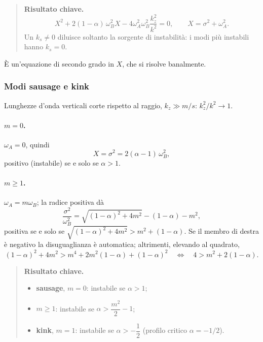 \begin{quote}
\textbf{Risultato chiave.}
\[
X^2+2(1-\alpha)\,\omega_B^2X-4\omega_A^2\omega_B^2\frac{k_z^2}{k^2}=0,\qquad X=\sigma^2+\omega_A^2 .
\]
Un $k_s\neq0$ diluisce soltanto la sorgente di instabilità: i modi più instabili hanno $k_s=0$.
\end{quote}

È un'equazione di secondo grado in $X$, che si risolve banalmente.

\subsubsection{Modi sausage e kink}

Lunghezze d'onda verticali corte rispetto al raggio, $k_z\gg m/s$: $k_z^2/k^2\to1$.

\paragraph{$m=0$.} $\omega_A=0$, quindi
\begin{equation}
X=\sigma^2=2(\alpha-1)\,\omega_B^2 ,
\end{equation}
positivo (instabile) se e solo se $\alpha>1$.

\paragraph{$m\ge1$.} $\omega_A=m\omega_B$; la radice positiva dà
\begin{equation}
\frac{\sigma^2}{\omega_B^2}=\sqrt{(1-\alpha)^2+4m^2}-(1-\alpha)-m^2 ,
\end{equation}
positiva se e solo se $\sqrt{(1-\alpha)^2+4m^2}>m^2+(1-\alpha)$. Se il membro di destra è negativo la disuguaglianza è automatica; altrimenti, elevando al quadrato,
\begin{equation}
(1-\alpha)^2+4m^2>m^4+2m^2(1-\alpha)+(1-\alpha)^2\quad\Longleftrightarrow\quad4>m^2+2(1-\alpha).
\end{equation}

\begin{quote}
\textbf{Risultato chiave.}
\begin{itemize}
\item \textbf{sausage}, $m=0$: instabile se $\alpha>1$;
\item $m\ge1$: instabile se $\alpha>\dfrac{m^2}{2}-1$;
\item \textbf{kink}, $m=1$: instabile se $\alpha>-\dfrac12$ (profilo critico $\alpha=-1/2$).
\end{itemize}
\end{quote}

